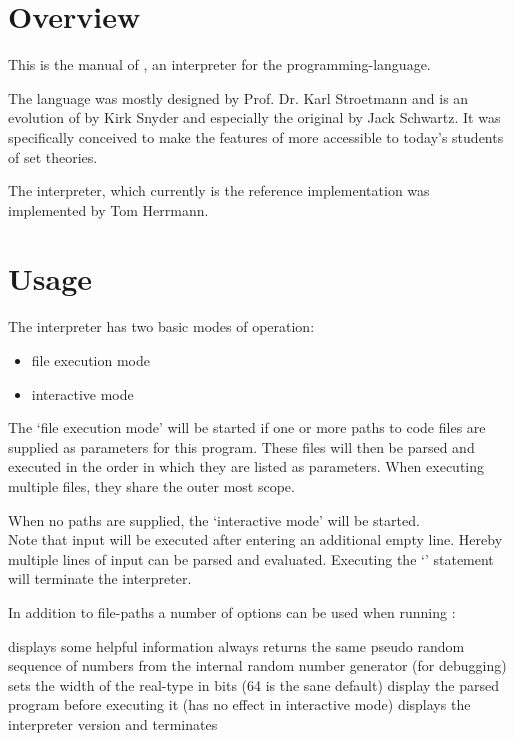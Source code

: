 \section{Overview}

This is the manual of \setlX, an interpreter for the \SetlX{} programming-language.

The \SetlX{} language was mostly designed by Prof. Dr. Karl Stroetmann and is an evolution of \SetlTwo{} by Kirk Snyder and especially the original \Setl{} by Jack Schwartz. It was specifically conceived to make the features of \Setl{} more accessible to today's students of set theories.

The \setlX{} interpreter, which currently is the \SetlX{} reference implementation was implemented by Tom Herrmann.

\section{Usage}

The \setlX{} interpreter has two basic modes of operation:
\begin{itemize}
	\item file execution mode
	\item interactive mode
\end{itemize}

The `file execution mode' will be started if one or more paths to code files are supplied as parameters for this program. These files will then be parsed and executed in the order in which they are listed as parameters. When executing multiple files, they share the outer most scope.

When no paths are supplied, the `interactive mode' will be started.\\
Note that input will be executed after entering an additional empty line. Hereby multiple lines of input can be parsed and evaluated. Executing the `' statement will terminate the interpreter.


In addition to file-paths a number of options can be used when running \setlX{}:

\begin{itemize}
	      {displays some helpful information}
	      {always returns the same pseudo random sequence of numbers from the internal random number generator (for debugging)}
           {sets the width of the real-type in bits (64 is the sane default)}
           {display the parsed program before executing it (has no effect in interactive mode)}
           {displays the interpreter version and terminates}
\end{itemize}

